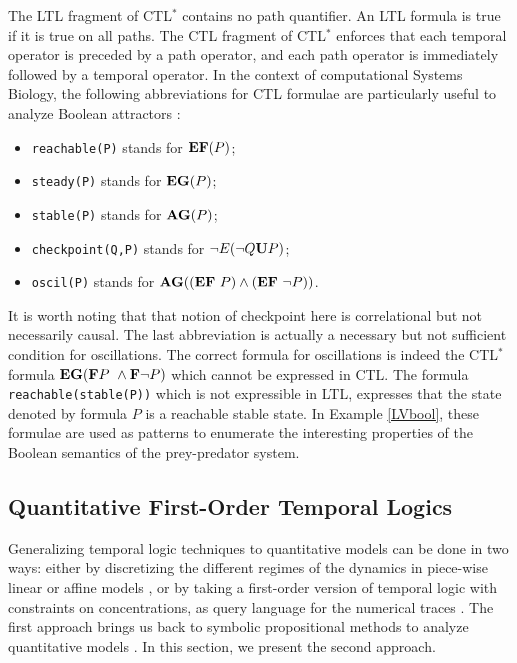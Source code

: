 \documentclass[graybox]{svmult}
\def\F{{\bf F}}
\def\U{{\bf U}}
\def\EF{{\bf EF}}
\def\EG{{\bf EG}}
\def\AG{{\bf AG}}
\begin{document}
The LTL fragment of CTL$^*$ contains no path quantifier. An LTL formula is true if it is true on all paths.
The CTL fragment of CTL$^*$
enforces that each temporal operator is preceded
by a path operator, and each path operator is immediately followed by a
temporal operator.
In the context of computational Systems Biology,
the following abbreviations for CTL formulae are particularly useful to analyze Boolean attractors \cite{CF03cmsb,TFFT16bi}: %
\begin{itemize}
   \item {\small\tt reachable(P)} stands for $\EF(P)$;
   \item {\small\tt steady(P)} stands for $\EG(P)$;
   \item {\small\tt stable(P)} stands for $\AG(P)$;
   \item {\small\tt      checkpoint(Q,P)} stands for $\neg E(\neg Q \U P)$;
   \item {\small\tt oscil(P)} stands for $\AG ((\EF\ P) \wedge (\EF\ \neg P))$.
\end{itemize}
It is worth noting that that notion of checkpoint here is correlational but not necessarily causal.
The last abbreviation is actually a necessary but not sufficient condition for oscillations.
The correct formula for oscillations is indeed the CTL$^*$ formula
$\EG (\F P\ \wedge \F\neg P)$ which cannot be expressed in CTL.
The formula {\small\tt reachable(stable(P))} which is not expressible in LTL, expresses that the state denoted by formula $P$ is a reachable stable state.
In Example \ref{LVbool}, these formulae are used as patterns to enumerate the interesting properties
of the Boolean semantics of the prey-predator system.



\subsection{Quantitative First-Order Temporal Logics} %

Generalizing temporal logic techniques to quantitative models can be done in two ways:
either by discretizing the different regimes of the dynamics in piece-wise linear or affine models \cite{BPCGMJ10bi,BBJGM04iswmcss,JGHPSG04bmb},
or by taking a first-order version of temporal logic  with constraints on concentrations,
as query language for the numerical traces \cite{APUM03cbp,FR08tcs,DM10formats}.
The first approach brings us back to symbolic propositional methods to analyze quantitative models \cite{BBCdJDGMMPRR12}.
In this section, we present the second approach.
\end{document}
